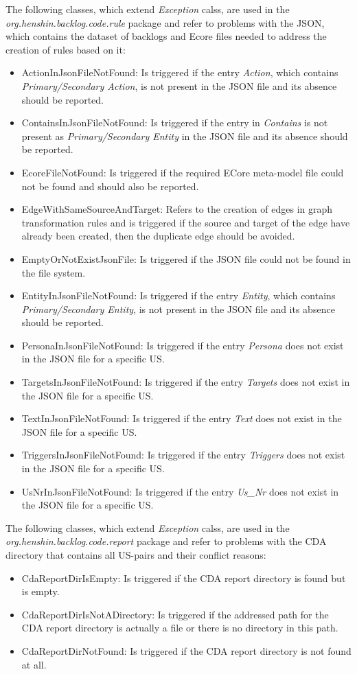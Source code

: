 The following classes, which extend \textit{Exception} calss, are used in the \textit{org.henshin.backlog.code.rule} package and refer to problems with the JSON, which contains the dataset of backlogs and Ecore files needed to address the creation of rules based on it:
\begin{itemize}
	\item ActionInJsonFileNotFound: Is triggered if the entry \textit{Action}, which contains \textit{Primary/Secondary Action}, is not present in the JSON file and its absence should be reported.
	\item ContainsInJsonFileNotFound: Is triggered if the entry in \textit{Contains} is not present as \textit{Primary/Secondary Entity} in the JSON file and its absence should be reported.
	\item EcoreFileNotFound: Is triggered if the required ECore meta-model file could not be found and should also be reported.
	\item EdgeWithSameSourceAndTarget: Refers to the creation of edges in graph transformation rules and is triggered if the source and target of the edge have already been created, then the duplicate edge should be avoided.
	\item EmptyOrNotExistJsonFile: Is triggered if the JSON file could not be found in the file system.
	\item EntityInJsonFileNotFound: Is triggered if the entry \textit{Entity}, which contains \textit{Primary/Secondary Entity}, is not present in the JSON file and its absence should be reported.
	\item PersonaInJsonFileNotFound: Is triggered if the entry \textit{Persona} does not exist in the JSON file for a specific US.
	\item TargetsInJsonFileNotFound: Is triggered if the entry \textit{Targets} does not exist in the JSON file for a specific US.
	\item TextInJsonFileNotFound: Is triggered if the entry \textit{Text} does not exist in the JSON file for a specific US. 
	\item TriggersInJsonFileNotFound: Is triggered if the entry \textit{Triggers} does not exist in the JSON file for a specific US. 
	\item UsNrInJsonFileNotFound: Is triggered if the entry \textit{Us\_Nr} does not exist in the JSON file for a specific US.
\end{itemize}
The following classes, which extend \textit{Exception} calss, are used in the \textit{org.henshin.backlog.code.report} package and refer to problems with the CDA directory that contains all US-pairs and their conflict reasons:
\begin{itemize}
	\item CdaReportDirIsEmpty: Is triggered if the CDA report directory is found but is empty.
	\item CdaReportDirIsNotADirectory: Is triggered if the addressed path for the CDA report directory is actually a file or there is no directory in this path.
	\item CdaReportDirNotFound: Is triggered if the CDA report directory is not found at all.
\end{itemize}
